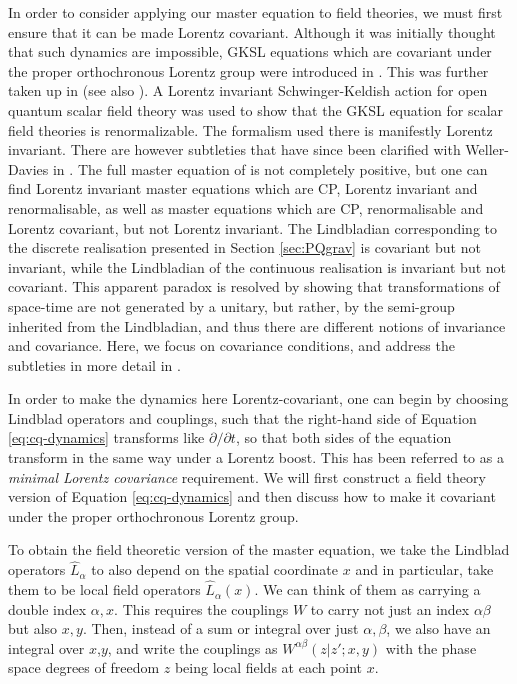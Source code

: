 \documentclass[aps,pra,showpacs,citeautoscript,amsmath,amssymb,floatfix,superscriptaddress,bbm, verbatim,amsfonts,changes,10pt,nofootinbib,longbibliography]{revtex4-1}
\def\z{{z}}
\def\L{{\hat{L}}}
\def\rate{{W}}
\def\ab{^{\alpha\beta}}
\def\rateabx{{\rate\ab(\z|\z';x,y)}}
\begin{document}
In order to consider applying our master equation to field theories, we must first ensure that it can be made Lorentz covariant.
Although it was initially thought that such dynamics are impossible\cite{srednicki-purity}, GKSL equations which are covariant under the proper orthochronous Lorentz group were introduced in \cite{alicki-reldecoherence}. This was further taken up in \cite{poulinKITP,OR-intrinsic} (see also \cite{beckman2001causal}).  A Lorentz invariant Schwinger-Keldish action for open quantum scalar field theory was used to show that the GKSL equation for scalar field theories is renormalizable\cite{baidya2017renormalization}. The formalism used there is manifestly Lorentz invariant. There are however subtleties that have since been clarified with Weller-Davies in \cite{UCLLorentz}. The full master equation of \cite{baidya2017renormalization} is not completely positive, but one can find Lorentz invariant master equations which are CP, Lorentz invariant and renormalisable, as well as master equations which are CP, renormalisable and Lorentz covariant, but not Lorentz invariant. The Lindbladian corresponding to the discrete realisation presented in Section \ref{sec:PQgrav} is covariant but not invariant, while the Lindbladian of the continuous realisation is invariant but not covariant. This apparent paradox is resolved by showing that transformations of space-time are not generated by a unitary, but rather, by the semi-group inherited from the Lindbladian, and thus there are different notions of invariance and covariance\cite{UCLLorentz}. Here, we focus on covariance conditions, and address the subtleties in more detail in \cite{UCLLorentz,oppenheim2023covariant}\label{ft:renorm}. 


In order to make the dynamics here Lorentz-covariant, one can begin by choosing Lindblad operators and couplings, such that the right-hand side of Equation \eqref{eq:cq-dynamics} transforms like $\partial/\partial t$, so that both sides of the equation transform
in the same way under a Lorentz boost.  This has been referred to as a {\it minimal Lorentz covariance} requirement\cite{srednicki-purity}.
We will first construct a field theory version of Equation \eqref{eq:cq-dynamics} and then discuss how to make it covariant under the proper orthochronous Lorentz group. 


To obtain the field theoretic version of the master equation, we take the Lindblad operators $\L_{\alpha}$ to also depend on the spatial coordinate $x$ and in particular, take them to be local field operators  $\L_{\alpha}(x)$. We can think of them as carrying a double index $\alpha,x$. This requires the couplings $\rate$ to carry not just an index $\alpha\beta$ but also $x,y$.
Then, instead of a sum or integral over just $\alpha,\beta$, we also have an integral over $x$,$y$, and write the couplings as $\rateabx$ with the phase space degrees of freedom $\z$ being local fields at each point $x$.
\end{document}
